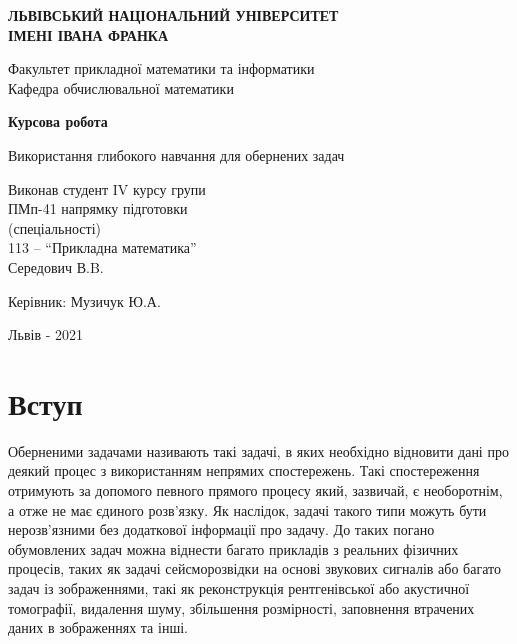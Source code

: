 \documentclass[14pt,a4paper]{extarticle}
\newcounter{e}
\newcounter{tabl}
\numberwithin{equation}{section}
\numberwithin{figure}{section}
\begin{document}
	\begin{titlepage}%
		\begin{center}
			{\textbf{ЛЬВІВСЬКИЙ НАЦІОНАЛЬНИЙ УНІВЕРСИТЕТ \\ ІМЕНІ ІВАНА ФРАНКА}}\par
			{Факультет прикладної математики та інформатики \\ Кафедра обчислювальної математики}\par
			\vspace{40mm}
			{\textbf{\huge{Курсова робота}}}\par
			\vspace{5mm}
			{\large{Використання глибокого навчання для обернених задач}}\par
			\vspace{5mm}\par %
		\end{center}
		
		\vfill
		\vskip80pt
		
		\begin{flushleft}
			\hskip 8cm 
			Виконав студент IV курсу групи
			\\ \hskip8cm
			ПМп-41 напрямку підготовки 
			\\ \hskip8cm
			(спеціальності)
			\\ \hskip8cm
			113 -- ``Прикладна математика''
			\\ \hskip8cm
			Середович В.B.
		\end{flushleft}
		\begin{flushleft}
			\hskip8cm 
			Керівник: Музичук Ю.А.
		\end{flushleft}
		
		\vfill
		
		\begin{center}
			\large
			Львів - 2021
		\end{center}
	\end{titlepage}

	\tableofcontents

	
	\newpage
	\thispagestyle{empty}
	\section*{Вступ}
	Оберненими задачами називають такі задачі, в яких необхідно відновити дані про деякий процес з використанням непрямих спостережень. Такі спостереження отримують за допомого певного прямого процесу який, зазвичай, є необоротнім, а отже не має єдиного розв'язку. Як наслідок, задачі такого типи можуть бути нерозв'язними без додаткової інформації про задачу. До таких погано обумовлених задач можна віднести багато прикладів з реальних фізичних процесів, таких як задачі сейсморозвідки на основі звукових сигналів або багато задач із зображеннями, такі як реконструкція рентгенівської або акустичної томографії, видалення шуму, збільшення розмірності, заповнення втрачених даних в зображеннях та інші. 
	
\end{document}
